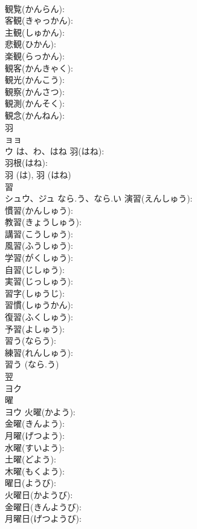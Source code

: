\documentclass[8pt]{extreport}
\begin{document}
\begin{CJK}{UTF8}{min}
\\	観覧(かんらん): 
\\	客観(きゃっかん): 
\\	主観(しゅかん): 
\\	悲観(ひかん): 
\\	楽観(らっかん): 
\\	観客(かんきゃく): 
\\	観光(かんこう): 
\\	観察(かんさつ): 
\\	観測(かんそく): 
\\	観念(かんねん): 
\\	羽			
\\	ョョ 
\\	ウ	は、わ、はね	羽(はね): 
\\	羽根(はね): 
\\	羽 (は), 羽 (はね)
\\	習			
\\	シュウ、ジュ	なら.う、なら.い	演習(えんしゅう): 
\\	慣習(かんしゅう): 
\\	教習(きょうしゅう): 
\\	講習(こうしゅう): 
\\	風習(ふうしゅう): 
\\	学習(がくしゅう): 
\\	自習(じしゅう): 
\\	実習(じっしゅう): 
\\	習字(しゅうじ): 
\\	習慣(しゅうかん): 
\\	復習(ふくしゅう): 
\\	予習(よしゅう): 
\\	習う(ならう): 
\\	練習(れんしゅう): 
\\	習う (なら.う)
\\	翌			
\\	ヨク			
\\	曜			
\\	ヨウ		火曜(かよう): 
\\	金曜(きんよう): 
\\	月曜(げつよう): 
\\	水曜(すいよう): 
\\	土曜(どよう): 
\\	木曜(もくよう): 
\\	曜日(ようび): 
\\	火曜日(かようび): 
\\	金曜日(きんようび): 
\\	月曜日(げつようび): 

\end{CJK}
\end{document}
